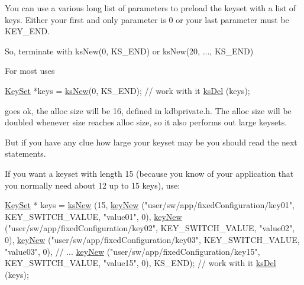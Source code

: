 You can use a various long list of parameters to preload the keyset with a list of keys. Either your first and only parameter is 0 or your last parameter must be K\+E\+Y\+\_\+\+E\+N\+D.

So, terminate with ks\+New(0, K\+S\+\_\+\+E\+N\+D) or ks\+New(20, ..., K\+S\+\_\+\+E\+N\+D)

For most uses 
\begin{DoxyCode}
\hyperlink{classkdb_1_1KeySet_a4eac9850fa4f06c07a5306befc3e4377}{KeySet} *keys = \hyperlink{group__keyset_ga671e1aaee3ae9dc13b4834a4ddbd2c3c}{ksNew}(0, KS\_END);
\textcolor{comment}{// work with it}
\hyperlink{group__keyset_ga27e5c16473b02a422238c8d970db7ac8}{ksDel} (keys);
\end{DoxyCode}
 goes ok, the alloc size will be 16, defined in kdbprivate.\+h. The alloc size will be doubled whenever size reaches alloc size, so it also performs out large keysets.

But if you have any clue how large your keyset may be you should read the next statements.

If you want a keyset with length 15 (because you know of your application that you normally need about 12 up to 15 keys), use\+: 
\begin{DoxyCode}
\hyperlink{classkdb_1_1KeySet_a4eac9850fa4f06c07a5306befc3e4377}{KeySet} * keys = \hyperlink{group__keyset_ga671e1aaee3ae9dc13b4834a4ddbd2c3c}{ksNew} (15,
        \hyperlink{group__key_gad23c65b44bf48d773759e1f9a4d43b89}{keyNew} (\textcolor{stringliteral}{"user/sw/app/fixedConfiguration/key01"}, KEY\_SWITCH\_VALUE, \textcolor{stringliteral}{"value01"}, 0),
        \hyperlink{group__key_gad23c65b44bf48d773759e1f9a4d43b89}{keyNew} (\textcolor{stringliteral}{"user/sw/app/fixedConfiguration/key02"}, KEY\_SWITCH\_VALUE, \textcolor{stringliteral}{"value02"}, 0),
        \hyperlink{group__key_gad23c65b44bf48d773759e1f9a4d43b89}{keyNew} (\textcolor{stringliteral}{"user/sw/app/fixedConfiguration/key03"}, KEY\_SWITCH\_VALUE, \textcolor{stringliteral}{"value03"}, 0),
        \textcolor{comment}{// ...}
        \hyperlink{group__key_gad23c65b44bf48d773759e1f9a4d43b89}{keyNew} (\textcolor{stringliteral}{"user/sw/app/fixedConfiguration/key15"}, KEY\_SWITCH\_VALUE, \textcolor{stringliteral}{"value15"}, 0),
        KS\_END);
\textcolor{comment}{// work with it}
\hyperlink{group__keyset_ga27e5c16473b02a422238c8d970db7ac8}{ksDel} (keys);
\end{DoxyCode}


